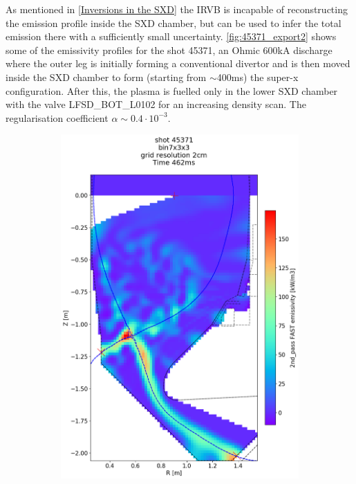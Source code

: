 As mentioned in \autoref{Inversions in the SXD} the IRVB is incapable of reconstructing the emission profile inside the SXD chamber, but can be used to infer the total emission there with a sufficiently small uncertainty. \autoref{fig:45371_export2} shows some of the emissivity profiles for the shot 45371, an Ohmic 600kA discharge where the outer leg is initially forming a conventional divertor and is then moved inside the SXD chamber to form (starting from $\sim$400ms) the super-x configuration. After this, the plasma is fuelled only in the lower SXD chamber with the valve LFSD\_BOT\_L0102 for an increasing density scan. The regularisation coefficient $\alpha \sim 0.4 \cdot 10^{-3}$.
\begin{figure}[!ht]
     \centering
     \begin{subfigure}{0.395\linewidth}
         \centering
         \includegraphics[trim={75 40 0 190},clip,width=\textwidth]{Chapters/chapter2/figs/IRVB-MASTU_shot-45371_export_7.png}

\end{subfigure}
\end{figure}
